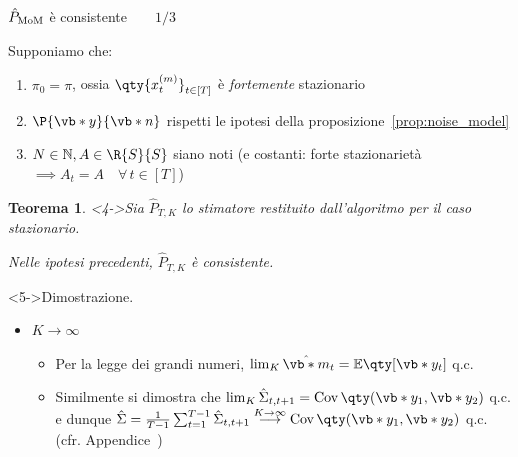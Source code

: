 \documentclass[10pt,xcolor={table,dvipsnames}]{beamer} 		%
\theoremstyle{plain}					%
\newtheorem{teorema}{Teorema}%
\theoremstyle{definition}
\theoremstyle{remark}
\newcommand{\Cov}[1]{\operatorname{Cov}\qty(#1)}
\begin{document}
    \begin{frame}
        {\hypertarget{frame:teorema_1_part1}{$\hat{P}_{\textup{MoM}}$ è consistente$\qquad 1/3$}}

        Supponiamo che:
        \begin{enumerate}
            \item $\pi_0=\pi$, ossia $\qty{x_t^{(m)}}_{t\in[T]}$ è \emph{fortemente} stazionario
            \item<2-> $\P{\vb*{y}}{\vb*{n}}$ rispetti le ipotesi della proposizione~\ref{prop:noise_model}
            \item<3-> $N\in\mathbb{N}, A\in\R{S}{S}$ siano noti {\smaller (e costanti: forte stazionarietà $\implies A_t=A\quad\forall\,t\in[T]$)}
        \end{enumerate}

        \begin{teorema}<4->\label{teor:consistenza_P_mom}
            Sia $\hat{P}_{T,K}$ lo stimatore restituito dall'algoritmo per il caso stazionario.

            Nelle ipotesi precedenti, $\hat{P}_{T,K}$ è consistente.%
        \end{teorema}
        \begin{block}<5->{Dimostrazione.}
            \begin{itemize}
                \item ${K\to\infty}$
                \begin{itemize}
                    \item<5-> Per la legge dei grandi numeri, $\lim_K\hat{\vb*{m}}_t=\mathbb{E}\qty[\vb*{y}_t]$ q.c.
                    \item<7-> Similmente si dimostra che $\lim_K\hat{\Sigma}_{t,t+1}=\Cov{\vb*{y}_1,\vb*{y}_2}$ q.c.
                    e dunque $\hat{\Sigma}=\frac{1}{T-1}\sum_{t=1}^{T-1}\hat{\Sigma}_{t,t+1}\overset{K\to\infty}{\longrightarrow}\Cov{\vb*{y}_1,\vb*{y}_2}$ q.c.
                    (cfr. Appendice~\hyperlink{frame:teorema1_lim_Sigmahat:appendice}{\faHandPointRight})
                \end{itemize}
            \end{itemize}
        \end{block}
    \end{frame}
\end{document}
